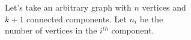 \documentclass[preview]{standalone}
\begin{document}
\begin{center}
Let's take an arbitrary graph with $n$ vertices and \\$k+1$ connected components. Let $n_i$ be the \\ number of vertices in the $i^{th}$ component.
\end{center}
\end{document}
